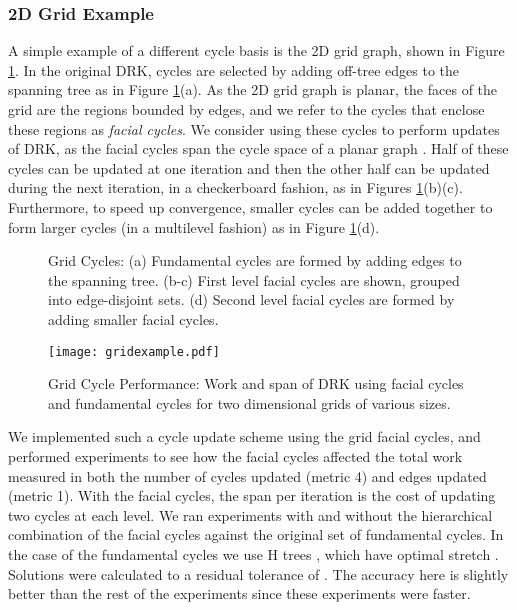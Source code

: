 \documentclass{sig-alternate}
\begin{document}
\subsubsection{2D Grid Example}
A simple example of a different cycle basis is the
2D grid graph, shown in Figure \ref{grid}.
In the original DRK, cycles are selected by adding
off-tree edges to the spanning tree as in Figure \ref{grid}(a).
As the 2D grid graph is planar, the faces of
the grid are the regions bounded by edges, and we refer
to the cycles that enclose these regions as \textit{facial cycles}.
We consider using these cycles to perform updates of DRK, as
the facial cycles span the
cycle space of a planar graph \cite{Diestel2010}.
Half of these cycles
can be updated at one iteration and then the other half can be updated
during the next iteration, in a checkerboard fashion, as in
Figures \ref{grid}(b)(c). Furthermore, to speed up convergence, smaller cycles
can be added together to form larger cycles (in a multilevel fashion)
as in Figure \ref{grid}(d).
\begin{figure}[htb]
\centering
\begin{minipage}{.22\textwidth}
\end{minipage}
\begin{minipage}{.22\textwidth}
\end{minipage}
\begin{minipage}{.22\textwidth}
\end{minipage}
\begin{minipage}{.22\textwidth}
\end{minipage}
\caption{Grid Cycles: (a) Fundamental cycles are formed by adding edges to the spanning
tree. (b-c) First level facial cycles are shown, grouped into edge-disjoint sets. (d)
Second level facial cycles are formed by adding smaller facial cycles.}
\label{grid}
\end{figure}

\begin{figure}[htb!]
\centering
\texttt{[image: gridexample.pdf]}
\caption{Grid Cycle Performance:
Work and span of DRK using facial cycles and fundamental cycles
for two dimensional grids of various sizes.}
\label{plot:gridresults}
\end{figure}

We implemented such a cycle update scheme using the grid
facial cycles, and performed experiments to see how the facial cycles affected
the total work measured in both the number of cycles updated (metric 4)
and edges updated (metric 1).
With the facial cycles,
the span per iteration is the cost of updating two cycles at each level.
We ran experiments with
and without the hierarchical combination of the facial cycles against the original
set of fundamental cycles.
In the case of the fundamental cycles we use H trees \cite{AKPW1995}, which
have optimal stretch .
Solutions were calculated to a residual tolerance of .
The accuracy here is slightly better than the rest of the experiments
since these experiments were faster.
\end{document}
